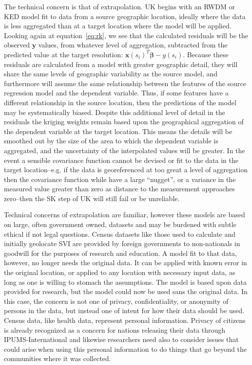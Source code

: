 \documentclass[draft]{article}
\begin{document}
The technical concern is that of extrapolation.  UK begins with an RWDM or KED model fit to data from a source geographic location, ideally where the data is less aggregated than at a target location where the model will be applied.  Looking again at equation~\ref{eq:rk}, we see that the calculated residuals will be the observed $\bm{y}$ values, from whatever level of aggregation, subtracted from the predicted value at the target resolution: $\bm{x}(s_i)^T \bm{\beta} - y(s_i)$.  Because these residuals are calculated from a model with greater geographic detail, they will share the same levels of geographic variability as the source model, and furthermore will assume the same relationship between the features of the source regression model and the dependent variable.  Thus, if some features have a different relationship in the source location, then the predictions of the model may be systematically biased.  Despite this additional level of detail in the residuals the kriging weights remain based upon the geographical aggregation of the dependent variable at the target location.  This means the details will be smoothed out by the size of the area to which the dependent variable is aggregated, and the uncertainty of the interpolated values will be greater.  In the event a sensible covariance function cannot be devised or fit to the data in the target location--e.g. if the data is georeferenced at too great a level of aggregation then the covariance function while have a large ``nugget'', or a variance in the measured value greater than zero as distance to the measurement approaches zero--then the SK step of UK will still fail or be unreliable.

Technical concerns of extrapolation are familiar, however these models are based on large, often government owned, datasets and may be burdened with subtle ethical if not legal questions.  Census datasets like those used to calculate and initially geolocate SVI are provided by foreign governments to non-nationals in goodwill for the purposes of research and education.  A model fit to that data, however, no longer needs the original data.  It can be applied with known error in the original location, or applied to any location with necessary input data, as long as one is willing to stomach the assumptions.  The model is based upon data provided for research, but the model could now be used sans the original data.  In this case, the concern is not one of privacy, confidentiality, or anonymity of persons in the data, but instead one of intent for how their data should be used.  Census data, like health data, represent personal information.  Privacy of citizens is already recognized as a concern for nations releasing their data through IPUMS-International \cite{mccaa06} and likewise researchers need also to consider issues that could arise when using this personal information to do things that go beyond the communities where it was collected.
\end{document}
